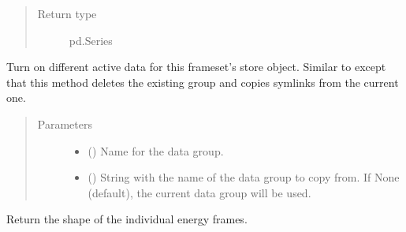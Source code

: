 \documentclass[letterpaper,10pt,english]{sphinxmanual}
\begin{document}
\begin{fulllineitems}
\begin{fulllineitems}
\begin{quote}
\begin{description}
\item[{Return type}] \leavevmode
pd.Series

\end{description}\end{quote}

\end{fulllineitems}


\begin{fulllineitems}
\label{\detokenize{xanespy:xanespy.xanes_frameset.XanesFrameset.fork_data_group}}
Turn on different active data for this frameset’s store
object. Similar to  except that this method
deletes the existing group and copies symlinks from the current one.
\begin{quote}\begin{description}
\item[{Parameters}] \leavevmode\begin{itemize}
\item {} 
 () \textendash{} Name for the data group.

\item {} 
 () \textendash{} String with the name of the data group to copy from. If None
(default), the current data group will be used.

\end{itemize}

\end{description}\end{quote}

\end{fulllineitems}


\begin{fulllineitems}
\label{\detokenize{xanespy:xanespy.xanes_frameset.XanesFrameset.frame_shape}}
Return the shape of the individual energy frames.

\end{fulllineitems}



\end{fulllineitems}
\end{document}
